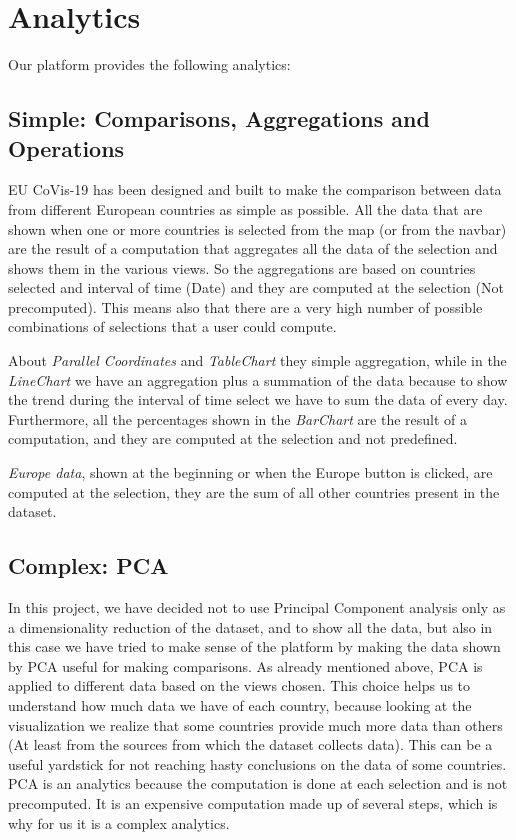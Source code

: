 \documentclass[10pt,conference]{IEEEtran}
\begin{document}
\section{Analytics}
Our platform provides the following analytics:
\subsection{Simple: Comparisons, Aggregations and Operations} 
EU CoVis-19 has been designed and built to make the comparison between data from different European countries as simple as possible. All the data that are shown when one or more countries is selected from the map (or from the navbar) are the result of a computation that aggregates all the data of the selection and shows them in the various views.
So the aggregations are based on countries selected and interval of time (Date) and they are computed at the selection (Not precomputed). This means also that there are a very high number of possible combinations of selections that a user could compute. 

About {\em Parallel Coordinates} and {\em TableChart} they simple aggregation, while in the {\em LineChart} we have an aggregation plus a summation of the data because to show the trend during the interval of time select we have to sum the data of every day. Furthermore, all the percentages shown in the {\em BarChart} are the result of a computation, and they are computed at the selection and not predefined.

{\em Europe data}, shown at the beginning or when the Europe button is clicked, are computed at the selection, they are the sum of all other countries present in the dataset.

\subsection{Complex: PCA}
In this project, we have decided not to use Principal Component analysis only as a dimensionality reduction of the dataset, and to show all the data, but also in this case we have tried to make sense of the platform by making the data shown by PCA useful for making comparisons. As already mentioned above, PCA is applied to different data based on the views chosen. This choice helps us to understand how much data we have of each country, because looking at the visualization we realize that some countries provide much more data than others (At least from the sources from which the dataset collects data). This can be a useful yardstick for not reaching hasty conclusions on the data of some countries. PCA is an analytics because the computation is done at each selection and is not precomputed. It is an expensive computation made up of several steps, which is why for us it is a complex analytics.
\end{document}
